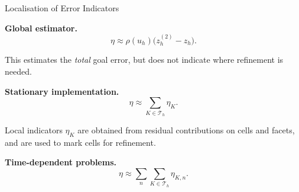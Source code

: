\documentclass[aspectratio=169]{beamer}
\begin{document}
\begin{frame}[t]{Localisation of Error Indicators}

\textbf{Global estimator.}
\[
\eta \approx \rho(u_h)\bigl(z_h^{(2)}-z_h\bigr).
\]

This estimates the \emph{total} goal error, but does not indicate
where refinement is needed.

\vspace{0.8em}
\pause

\textbf{Stationary implementation.}
\[
\eta \approx \sum_{K\in\mathcal T_h}\eta_K .
\]

Local indicators $\eta_K$ are obtained from residual contributions on
cells and facets, and are used to mark cells for refinement.

\vspace{0.8em}
\pause

\textbf{Time-dependent problems.}
\[
\eta \approx \sum_n \sum_{K\in\mathcal T_h}\eta_{K,n}.
\]


\end{frame}





\end{document}
